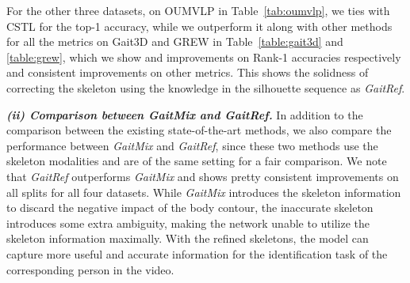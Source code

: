 \documentclass[10pt,twocolumn,letterpaper]{article}
\begin{document}
    
    
    
    For the other three datasets, on OUMVLP in Table~\ref{tab:oumvlp}, we ties with CSTL \cite{huang2021context} for the top-1 accuracy, while we outperform it along with other methods for all the metrics on Gait3D \cite{zheng2022gait} and GREW \cite{zhu2021gait} in Table~\ref{table:gait3d} and \ref{table:grew}, which we show  and  improvements on Rank-1 accuracies respectively and consistent improvements on other metrics. 
    This shows the solidness of correcting the skeleton using the knowledge in the silhouette sequence as \textit{GaitRef}.
    
    \textbf{\textit{(ii) Comparison between \textit{GaitMix} and \textit{GaitRef}.}} In addition to the comparison between the existing state-of-the-art methods, we also compare the performance between \textit{GaitMix} and \textit{GaitRef}, since these two methods use the skeleton modalities and are of the same setting for a fair comparison. We note that \textit{GaitRef} outperforms \textit{GaitMix} and shows pretty consistent improvements on all splits for all four datasets. While \textit{GaitMix} introduces the skeleton information to discard the negative impact of the body contour, the inaccurate skeleton introduces some extra ambiguity, making the network unable to utilize the skeleton information maximally. With the refined skeletons, the model can capture more useful and accurate information for the identification task of the corresponding person in the video.
    
    
    
\end{document}
